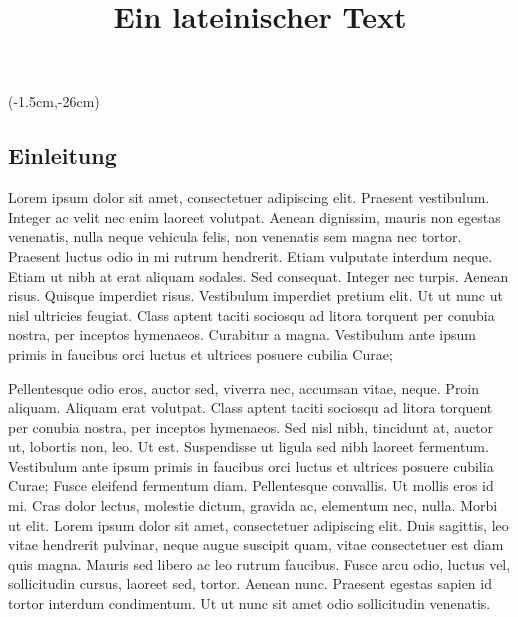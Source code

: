 \documentclass[a4paper,10pt,noonelinecaption,normalheadings]{scrartcl}
\begin{document}
\title{Ein lateinischer Text}
\author{}
\date{}
\maketitle

\begin{multicols}{2} %

\thisfancyput*(-1.5cm,-26cm){}



\begin{linenumbers}

\section{Einleitung}

Lorem ipsum dolor sit amet, consectetuer adipiscing elit. Praesent vestibulum. Integer ac velit nec enim laoreet volutpat. Aenean dignissim, mauris non egestas venenatis, nulla neque vehicula felis, non venenatis sem magna nec tortor. Praesent luctus odio in mi rutrum hendrerit. Etiam vulputate interdum neque. Etiam ut nibh at erat aliquam sodales. Sed consequat. Integer nec turpis. Aenean risus. Quisque imperdiet risus. Vestibulum imperdiet pretium elit. Ut ut nunc ut nisl ultricies feugiat. Class aptent taciti sociosqu ad litora torquent per conubia nostra, per inceptos hymenaeos. Curabitur a magna. Vestibulum ante ipsum primis in faucibus orci luctus et ultrices posuere cubilia Curae;

Pellentesque odio eros, auctor sed, viverra nec, accumsan vitae, neque. Proin aliquam. Aliquam erat volutpat. Class aptent taciti sociosqu ad litora torquent per conubia nostra, per inceptos hymenaeos. Sed nisl nibh, tincidunt at, auctor ut, lobortis non, leo. Ut est. Suspendisse ut ligula sed nibh laoreet fermentum. Vestibulum ante ipsum primis in faucibus orci luctus et ultrices posuere cubilia Curae; Fusce eleifend fermentum diam. Pellentesque convallis. Ut mollis eros id mi. Cras dolor lectus, molestie dictum, gravida ac, elementum nec, nulla. Morbi ut elit. Lorem ipsum dolor sit amet, consectetuer adipiscing elit. Duis sagittis, leo vitae hendrerit pulvinar, neque augue suscipit quam, vitae consectetuer est diam quis magna. Mauris sed libero ac leo rutrum faucibus. Fusce arcu odio, luctus vel, sollicitudin cursus, laoreet sed, tortor. Aenean nunc. Praesent egestas sapien id tortor interdum condimentum. Ut ut nunc sit amet odio sollicitudin venenatis.


\end{linenumbers}
\end{multicols}
\end{document}
